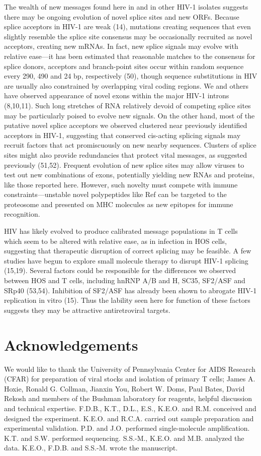 \documentclass[../sherrill-Mix_thesis.tex]{subfiles}
\begin{document}
The wealth of new messages found here in \hivEight{} and in other HIV-1 isolates suggests there may be ongoing evolution of novel splice sites and new ORFs. Because splice acceptors in HIV-1 are weak (14), mutations creating sequences that even slightly resemble the \threePrime{} splice site consensus may be occasionally recruited as novel acceptors, creating new mRNAs. In fact, new splice signals may evolve with relative ease---it has been estimated that reasonable matches to the consensus for splice donors, acceptors and branch-point sites occur within random sequence every 290, 490 and 24 bp, respectively (50), though sequence substitutions in HIV are usually also constrained by overlapping viral coding regions. We and others have observed appearance of novel exons within the major HIV-1 introns (8,10,11). Such long stretches of RNA relatively devoid of competing splice sites may be particularly poised to evolve new signals. On the other hand, most of the putative novel splice acceptors we observed clustered near previously identified acceptors in HIV-1, suggesting that conserved cis-acting splicing signals may recruit factors that act promiscuously on new nearby sequences. Clusters of splice sites might also provide redundancies that protect vital messages, as suggested previously (51,52). Frequent evolution of new splice sites may allow viruses to test out new combinations of exons, potentially yielding new RNAs and proteins, like those reported here. However, such novelty must compete with immune constraints---unstable novel polypeptides like Ref can be targeted to the proteosome and presented on MHC molecules as new epitopes for immune recognition.

HIV has likely evolved to produce calibrated message populations in T cells which seem to be altered with relative ease, as in infection in HOS cells, suggesting that therapeutic disruption of correct splicing may be feasible. A few studies have begun to explore small molecule therapy to disrupt HIV-1 splicing (15,19). Several factors could be responsible for the differences we observed between HOS and T cells, including hnRNP A/B and H, SC35, SF2/ASF and SRp40 (53,54). Inhibition of SF2/ASF has already been shown to abrogate HIV-1 replication in vitro (15). Thus the lability seen here for function of these factors suggests they may be attractive antiretroviral targets. 

\section{Acknowledgements}
We would like to thank the University of Pennsylvania Center for AIDS Research (CFAR) for preparation of viral stocks and isolation of primary \cdFour{} T cells; James A. Hoxie, Ronald G. Collman, Jianxin You, Robert W. Doms, Paul Bates, David Rekosh and members of the Bushman laboratory for reagents, helpful discussion and technical expertise. F.D.B., K.T., D.L., E.S., K.E.O. and R.M. conceived and designed the experiment. K.E.O. and R.C.A. carried out sample preparation and experimental validation. P.D. and J.O. performed single-molecule amplification. K.T. and S.W. performed sequencing. S.S.-M., K.E.O. and M.B. analyzed the data. K.E.O., F.D.B. and S.S.-M. wrote the manuscript. 
\end{document}
